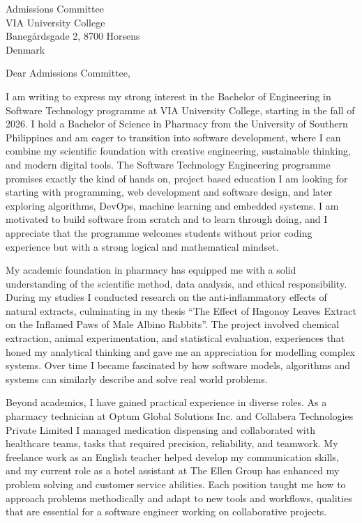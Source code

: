 \documentclass[11pt,a4paper]{letter}
\date{February 22, 2026}
\begin{document}
\begin{letter}{Admissions Committee \\ VIA University College \\ Banegårdsgade 2, 8700 Horsens \\ Denmark}

\opening{Dear Admissions Committee,}

I am writing to express my strong interest in the Bachelor of Engineering in Software Technology programme at VIA University College, starting in the fall of 2026. I hold a Bachelor of Science in Pharmacy from the University of Southern Philippines and am eager to transition into software development, where I can combine my scientific foundation with creative engineering, sustainable thinking, and modern digital tools. The Software Technology Engineering programme promises exactly the kind of hands on, project based education I am looking for starting with programming, web development and software design, and later exploring algorithms, DevOps, machine learning and embedded systems. I am motivated to build software from scratch and to learn through doing, and I appreciate that the programme welcomes students without prior coding experience but with a strong logical and mathematical mindset.

My academic foundation in pharmacy has equipped me with a solid understanding of the scientific method, data analysis, and ethical responsibility. During my studies I conducted research on the anti-inflammatory effects of natural extracts, culminating in my thesis \enquote{The Effect of Hagonoy Leaves Extract on the Inflamed Paws of Male Albino Rabbits}. The project involved chemical extraction, animal experimentation, and statistical evaluation, experiences that honed my analytical thinking and gave me an appreciation for modelling complex systems. Over time I became fascinated by how software models, algorithms and systems can similarly describe and solve real world problems.

Beyond academics, I have gained practical experience in diverse roles. As a pharmacy technician at Optum Global Solutions Inc. and Collabera Technologies Private Limited I managed medication dispensing and collaborated with healthcare teams, tasks that required precision, reliability, and teamwork. My freelance work as an English teacher helped develop my communication skills, and my current role as a hotel assistant at The Ellen Group has enhanced my problem solving and customer service abilities. Each position taught me how to approach problems methodically and adapt to new tools and workflows, qualities that are essential for a software engineer working on collaborative projects.


\end{letter}
\end{document}
